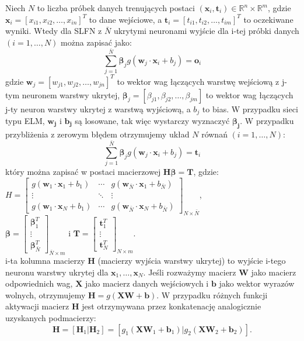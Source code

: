\documentclass{article}
\begin{document}
Niech $N$ to liczba próbek danych trenujących postaci $(\bm{x}_i, \bm{t}_i) \in \mathbb{R}^n \times \mathbb{R}^m$, gdzie $\bm{x}_i = [x_{i1}, x_{i2}, \dots,  x_{in}]^T$ to dane wejściowe, a $\bm{t}_i = [t_{i1}, t_{i2}, \dots,  t_{im}]^T$ to oczekiwane wyniki. Wtedy dla SLFN z $\bar{N}$ ukrytymi neuronami wyjście dla i-tej próbki danych $(i=1,\dots,N)$ można zapisać jako:
\begin{equation}
\sum_{j=1}^{\bar{N}} \bm{\beta}_j g (\bm{w}_j \cdot \bm{x}_i + b_j)  = \bm{o}_i
\end{equation}
gdzie $\bm{w}_j = [w_{j1}, w_{j2},\dots,w_{jn}]^T$ to wektor wag łączących warstwę wejściową z j-tym neuronem warstwy ukrytej, $\bm{\beta}_j = [\beta_{j1}, \beta_{j2}, \dots, \beta_{jm}]$ to wektor wag łączących j-ty neuron warstwy ukrytej z warstwą wyjściową, a $b_j$ to bias. W przypadku sieci typu ELM, $\bm{w_j}$ i $\bm{b_j}$ są losowane, tak więc wystarczy wyznaczyć $\bm{\beta_j}$.  W przypadku przybliżenia z zerowym błędem otrzymujemy układ $N$ równań $(i=1,\dots,N)$:
\begin{equation}
\sum_{j=1}^{\bar{N}} \bm{\beta}_j g (\bm{w}_j \cdot \bm{x}_i + b_j)  = \bm{t}_i
\end{equation}
który można zapisać w postaci macierzowej $\bm{H}\bm{\beta}=\bm{T}$, gdzie: \\
$
H = \begin{bmatrix}
 g(\bm{w}_1 \cdot \bm{x}_1 + b_1) & \cdots & g(\bm{w}_{\bar{N}} \cdot \bm{x}_1 + b_{\bar{N}}) \\
 \vdots & \ddots & \vdots \\
 g(\bm{w}_1 \cdot \bm{x}_N + b_1) & \cdots & g(\bm{w}_{\bar{N}} \cdot \bm{x}_N + b_{\bar{N}})
\end{bmatrix}_{N \times \bar{N}}$, \\
$\bm{\beta} = \begin{bmatrix} \bm{\beta}_1^T \\ \vdots \\ \bm{\beta}_{\bar{N}}^T \end{bmatrix}_{\bar{N} \times m}$ i 
 $ \bm{T} = \begin{bmatrix} \bm{t}_1^T \\ \vdots \\ \bm{t}_N^T \end{bmatrix}_{N \times m}. $\\
i-ta kolumna macierzy $\bm{H}$ (macierzy wyjścia warstwy ukrytej) to wyjście i-tego neuronu warstwy ukrytej dla $\bm{x}_1, \dots, \bm{x}_N$. Jeśli rozważymy macierz $\bm{W}$ jako macierz odpowiednich wag, $\bm{X}$ jako macierz danych wejściowych i $\bm{b}$ jako wektor wyrazów wolnych, otrzymujemy $\bm{H} = g(\bm{XW} + \bm{b})$. W przypadku różnych funkcji aktywacji macierz $\bm{H}$ jest otrzymywana przez konkatenację analogicznie uzyskanych podmacierzy: 
\begin{equation}
\bm{H} = [\bm{H}_1 | \bm{H}_2] = [g_1(\bm{XW}_1 + \bm{b}_1) | g_2(\bm{XW}_2 + \bm{b}_2)]. 
\end{equation}
\end{document}
